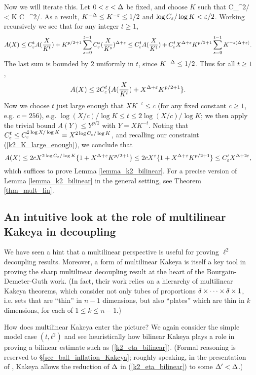 \documentclass[brochure,english,12pt]{bourbaki}%
\begin{document}
Now we will iterate this. Let $0<\varepsilon<\Delta$ be fixed, and choose $K$  such that
\beq\label{k2_K_large_enough}
C_\ep^{2/\ep} < K  C_\ep^{2/\ep}.
\eeq
As a result, $K^{-\Delta} \leq K^{-\varepsilon} \leq 1/2$
and $\log C_\varepsilon/ \log K < \varepsilon/2$.
Working recursively we see that for any integer $t \geq 1$, 
\[ A(X) \leq C_\varepsilon^t A(\frac{X}{K^t}) + K^{p/2+1} \sum_{s=0}^{t-1} C_\varepsilon^s(\frac{X}{K^s})^{\Delta+\varepsilon}
	 \leq C_\varepsilon^t A(\frac{X}{K^t}) +C_\varepsilon^t X^{\Delta+\varepsilon} K^{p/2+1} \sum_{s=0}^{t-1} K^{-s(\Delta+\varepsilon)}.
	 \]
The last sum is  bounded by $2$ uniformly in $t$, since $K^{-\Delta} \leq 1/2$.
 Thus for all $t \geq 1$,
\[ A(X) \leq 2C_\varepsilon^t \{ A(\frac{X}{K^t}) + X^{\Delta+\varepsilon} K^{p/2+1}\} .\]
Now we choose $t$ just  large enough that $XK^{-t} \leq c$ (for any fixed constant $c  \geq 1$, e.g. $c=256$), e.g.  $\log (X/c)/\log K \leq t \leq 2 \log (X/c)/ \log K$;
 we then apply the trivial bound $A(Y)\leq Y^{p/2}$ with $Y=XK^{-t}$. Noting that $C_\varepsilon^t \leq C_{\varepsilon}^{2 \log X/\log K} =  X^{2\log C_\varepsilon/ \log K}$,
 and recalling our constraint (\ref{k2_K_large_enough}), we conclude that 
\[ A(X) \leq 2c X^{2\log C_\varepsilon/\log K}\{ 1 + X^{\Delta+\varepsilon } K^{p/2+1} \}
	\leq 2c X^{\varepsilon}\{ 1 + X^{\Delta+\varepsilon } K^{p/2+1} \}
	\leq C_\varepsilon' X^{\Delta+2\varepsilon},\]
which suffices to prove Lemma \ref{lemma_k2_bilinear}.
For a precise version of Lemma \ref{lemma_k2_bilinear} in the general setting, see Theorem \ref{thm_mult_lin}.




\subsection{An intuitive look at the role of multilinear Kakeya in decoupling}\label{sec_uncertainty}
We have seen a hint that a multilinear perspective is useful for proving $\ell^2$ decoupling results. 
Moreover, a form of multilinear Kakeya  is itself a key tool in proving the sharp multilinear decoupling result at the heart of the Bourgain-Demeter-Guth work. (In fact, their work relies on a hierarchy of multilinear Kakeya theorems, which consider not only tubes of proportions $\delta \times \cdots \times \delta \times 1$, i.e. sets that are ``thin'' in $n-1$ dimensions, but also ``plates'' which are thin in $k$ dimensions, for each of $1 \leq k \leq n-1$.)

How does multilinear Kakeya enter the picture? We again consider the simple model case $(t,t^2)$ and see heuristically how bilinear Kakeya plays a role in proving a bilinear estimate such as  (\ref{k2_eta_bilinear}). (Formal reasoning is reserved to \S \ref{sec_ball_inflation_Kakeya}; roughly speaking, in the presentation of  \cite{Tao15bblog}, Kakeya allows the reduction of $\Delta$ in (\ref{k2_eta_bilinear}) to some $\Delta' < \Delta$.) 
\end{document}
